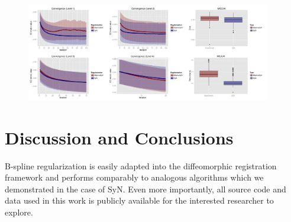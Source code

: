 \documentclass{frontiersSCNS}
\begin{document}
\begin{figure}[htb]
  \centering
  \includegraphics[width=0.95\textwidth]{allMICCAI.pdf}
  \caption{}
\end{figure}



\section{Discussion and Conclusions}

B-spline regularization is easily adapted into the diffeomorphic registration framework and performs comparably to analogous algorithms which we demonstrated in the case of SyN.  Even more importantly, all source code and data used in this work is publicly available for the interested researcher to explore.




\end{document}

